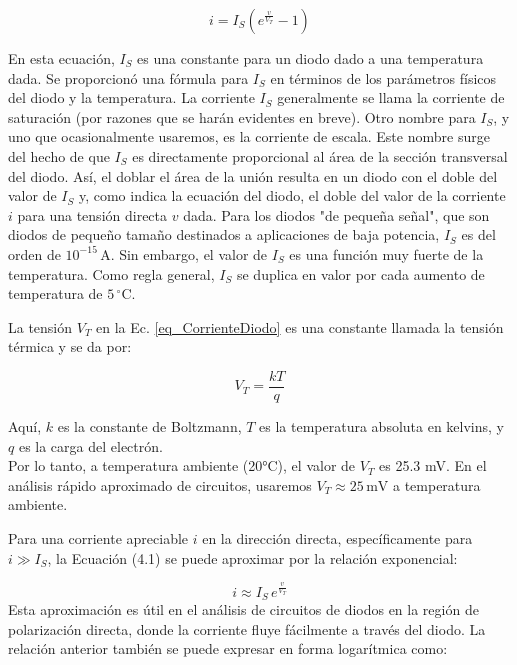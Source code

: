 \begin{equation}
i = I_S (e^{\frac{v}{V_T}}-1)
\label{eq_CorrienteDiodo}
\end{equation}

En esta ecuación, \( I_S \) es una constante para un diodo dado a una temperatura dada. Se proporcionó una fórmula para \( I_S \) en términos de los parámetros físicos del diodo y la temperatura. La corriente \( I_S \) generalmente se llama la corriente de saturación (por razones que se harán evidentes en breve). Otro nombre para \( I_S \), y uno que ocasionalmente usaremos, es la corriente de escala. Este nombre surge del hecho de que \( I_S \) es directamente proporcional al área de la sección transversal del diodo. Así, el doblar el área de la unión resulta en un diodo con el doble del valor de \( I_S \) y, como indica la ecuación del diodo, el doble del valor de la corriente \( i \) para una tensión directa \( v \) dada. Para los diodos "de pequeña señal", que son diodos de pequeño tamaño destinados a aplicaciones de baja potencia, \( I_S \) es del orden de \( 10^{-15} \, \text{A} \). Sin embargo, el valor de \( I_S \) es una función muy fuerte de la temperatura. Como regla general, \( I_S \) se duplica en valor por cada aumento de temperatura de \( 5\, ^\circ\text{C} \).

La tensión \( V_T \) en la Ec. \ref{eq_CorrienteDiodo}  es una constante llamada la tensión térmica y se da por:

\[ V_T = \frac{kT}{q} \]

Aquí, \( k \) es la constante de Boltzmann, \( T \) es la temperatura absoluta en kelvins, y \( q \) es la carga del electrón. \\

Por lo tanto, a temperatura ambiente (20°C), el valor de \( V_T \) es 25.3 mV. En el análisis rápido aproximado de circuitos, usaremos \( V_T \approx 25 \, \text{mV} \) a temperatura ambiente.

Para una corriente apreciable \( i \) en la dirección directa, específicamente para \( i \gg I_S \), la Ecuación (4.1) se puede aproximar por la relación exponencial:

\begin{equation}
i \approx I_S \, e^{\frac{v}{V_T}}
\label{eq_Corriente_i_diodoAproximado}
\end{equation}
Esta aproximación es útil en el análisis de circuitos de diodos en la región de polarización directa, donde la corriente fluye fácilmente a través del diodo. La relación anterior también se puede expresar en forma logarítmica como:

